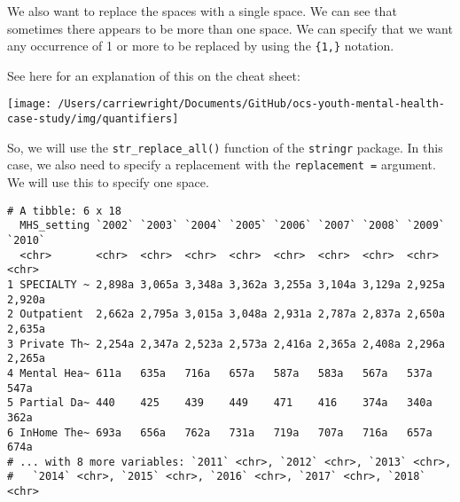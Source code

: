 \documentclass[
]{article}
\newenvironment{Shaded}{\begin{snugshade}}{\end{snugshade}}
\newcommand{\DataTypeTok}[1]{\textcolor[rgb]{0.13,0.29,0.53}{#1}}
\newcommand{\FloatTok}[1]{\textcolor[rgb]{0.00,0.00,0.81}{#1}}
\newcommand{\KeywordTok}[1]{\textcolor[rgb]{0.13,0.29,0.53}{\textbf{#1}}}
\newcommand{\NormalTok}[1]{#1}
\newcommand{\OperatorTok}[1]{\textcolor[rgb]{0.81,0.36,0.00}{\textbf{#1}}}
\newcommand{\StringTok}[1]{\textcolor[rgb]{0.31,0.60,0.02}{#1}}
\begin{document}
We also want to replace the spaces with a single space. We can see that
sometimes there appears to be more than one space. We can specify that
we want any occurrence of 1 or more to be replaced by using the
\texttt{\{1,\}} notation.

See here for an explanation of this on the cheat sheet:

\begin{center}\texttt{[image: /Users/carriewright/Documents/GitHub/ocs-youth-mental-health-case-study/img/quantifiers]} \end{center}

So, we will use the \texttt{str\_replace\_all()} function of the
\texttt{stringr} package. In this case, we also need to specify a
replacement with the \texttt{replacement\ =} argument. We will use this
to specify one space.

\begin{Shaded}
\end{Shaded}

\begin{verbatim}
# A tibble: 6 x 18
  MHS_setting `2002` `2003` `2004` `2005` `2006` `2007` `2008` `2009` `2010`
  <chr>       <chr>  <chr>  <chr>  <chr>  <chr>  <chr>  <chr>  <chr>  <chr> 
1 SPECIALTY ~ 2,898a 3,065a 3,348a 3,362a 3,255a 3,104a 3,129a 2,925a 2,920a
2 Outpatient  2,662a 2,795a 3,015a 3,048a 2,931a 2,787a 2,837a 2,650a 2,635a
3 Private Th~ 2,254a 2,347a 2,523a 2,573a 2,416a 2,365a 2,408a 2,296a 2,265a
4 Mental Hea~ 611a   635a   716a   657a   587a   583a   567a   537a   547a  
5 Partial Da~ 440    425    439    449    471    416    374a   340a   362a  
6 InHome The~ 693a   656a   762a   731a   719a   707a   716a   657a   674a  
# ... with 8 more variables: `2011` <chr>, `2012` <chr>, `2013` <chr>,
#   `2014` <chr>, `2015` <chr>, `2016` <chr>, `2017` <chr>, `2018` <chr>
\end{verbatim}
\end{document}
